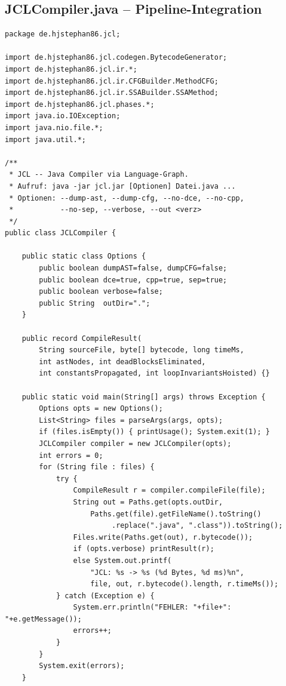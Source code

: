 ﻿\documentclass[a4paper,12pt]{article}
\theoremstyle{definition}
\begin{document}
\subsection{JCLCompiler.java -- Pipeline-Integration}

\begin{lstlisting}[style=javastyle,
    caption={JCLCompiler.java -- vollstaendige 13-Phasen-Pipeline}]
package de.hjstephan86.jcl;

import de.hjstephan86.jcl.codegen.BytecodeGenerator;
import de.hjstephan86.jcl.ir.*;
import de.hjstephan86.jcl.ir.CFGBuilder.MethodCFG;
import de.hjstephan86.jcl.ir.SSABuilder.SSAMethod;
import de.hjstephan86.jcl.phases.*;
import java.io.IOException;
import java.nio.file.*;
import java.util.*;

/**
 * JCL -- Java Compiler via Language-Graph.
 * Aufruf: java -jar jcl.jar [Optionen] Datei.java ...
 * Optionen: --dump-ast, --dump-cfg, --no-dce, --no-cpp,
 *           --no-sep, --verbose, --out <verz>
 */
public class JCLCompiler {

    public static class Options {
        public boolean dumpAST=false, dumpCFG=false;
        public boolean dce=true, cpp=true, sep=true;
        public boolean verbose=false;
        public String  outDir=".";
    }

    public record CompileResult(
        String sourceFile, byte[] bytecode, long timeMs,
        int astNodes, int deadBlocksEliminated,
        int constantsPropagated, int loopInvariantsHoisted) {}

    public static void main(String[] args) throws Exception {
        Options opts = new Options();
        List<String> files = parseArgs(args, opts);
        if (files.isEmpty()) { printUsage(); System.exit(1); }
        JCLCompiler compiler = new JCLCompiler(opts);
        int errors = 0;
        for (String file : files) {
            try {
                CompileResult r = compiler.compileFile(file);
                String out = Paths.get(opts.outDir,
                    Paths.get(file).getFileName().toString()
                         .replace(".java", ".class")).toString();
                Files.write(Paths.get(out), r.bytecode());
                if (opts.verbose) printResult(r);
                else System.out.printf(
                    "JCL: %s -> %s (%d Bytes, %d ms)%n",
                    file, out, r.bytecode().length, r.timeMs());
            } catch (Exception e) {
                System.err.println("FEHLER: "+file+": "+e.getMessage());
                errors++;
            }
        }
        System.exit(errors);
    }


\end{lstlisting}
\end{document}
